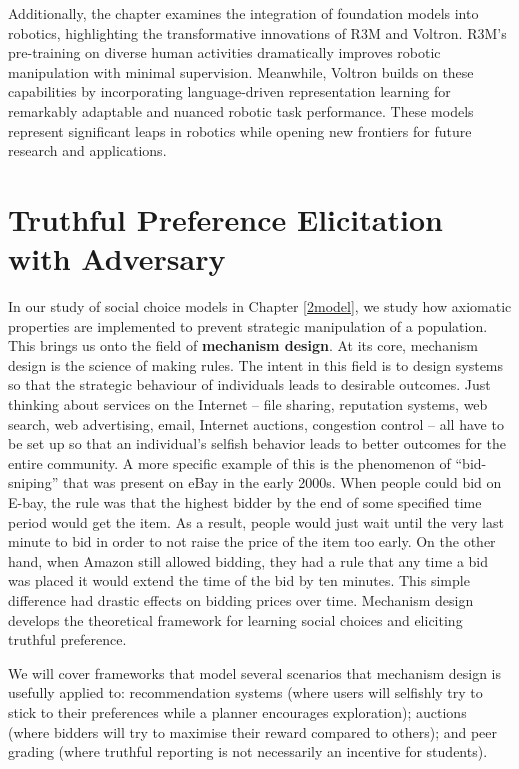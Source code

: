 \documentclass[
  letterpaper,
  DIV=11,
  numbers=noendperiod,
  oneside]{scrreprt}
\theoremstyle{remark}
\begin{document}
Additionally, the chapter examines the integration of foundation models
into robotics, highlighting the transformative innovations of R3M and
Voltron. R3M's pre-training on diverse human activities dramatically
improves robotic manipulation with minimal supervision. Meanwhile,
Voltron builds on these capabilities by incorporating language-driven
representation learning for remarkably adaptable and nuanced robotic
task performance. These models represent significant leaps in robotics
while opening new frontiers for future research and applications.

\section{Truthful Preference Elicitation with
Adversary}\label{truthful-preference-elicitation-with-adversary}

In our study of social choice models in Chapter
\hyperref[2model]{{[}2model{]}}, we study how axiomatic properties are
implemented to prevent strategic manipulation of a population. This
brings us onto the field of \textbf{mechanism design}. At its core,
mechanism design is the science of making rules. The intent in this
field is to design systems so that the strategic behaviour of
individuals leads to desirable outcomes. Just thinking about services on
the Internet -- file sharing, reputation systems, web search, web
advertising, email, Internet auctions, congestion control -- all have to
be set up so that an individual's selfish behavior leads to better
outcomes for the entire community. A more specific example of this is
the phenomenon of ``bid-sniping'' that was present on eBay in the early
2000s. When people could bid on E-bay, the rule was that the highest
bidder by the end of some specified time period would get the item. As a
result, people would just wait until the very last minute to bid in
order to not raise the price of the item too early. On the other hand,
when Amazon still allowed bidding, they had a rule that any time a bid
was placed it would extend the time of the bid by ten minutes. This
simple difference had drastic effects on bidding prices over time.
Mechanism design develops the theoretical framework for learning social
choices and eliciting truthful preference.

We will cover frameworks that model several scenarios that mechanism
design is usefully applied to: recommendation systems (where users will
selfishly try to stick to their preferences while a planner encourages
exploration); auctions (where bidders will try to maximise their reward
compared to others); and peer grading (where truthful reporting is not
necessarily an incentive for students).
\end{document}
